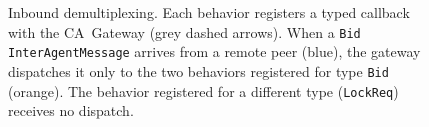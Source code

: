 \documentclass[deliverable]{csreport}
\begin{document}
\begin{figure}[tbh]
\caption{Inbound demultiplexing. Each behavior registers a typed callback with the
CA~Gateway (grey dashed arrows). When a \texttt{Bid} \texttt{InterAgentMessage}
arrives from a remote peer (blue), the gateway dispatches it only to the two behaviors
registered for type \texttt{Bid} (orange). The behavior registered for a different
type (\texttt{LockReq}) receives no dispatch.}
\label{fig:gw_inbound}
\end{figure}
\end{document}
